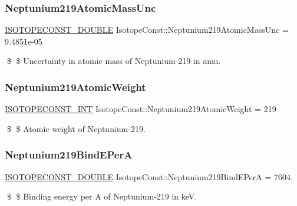 \subsubsection{\texorpdfstring{Neptunium219\+Atomic\+Mass\+Unc}{Neptunium219AtomicMassUnc}}
{\footnotesize\ttfamily \mbox{\hyperlink{group___isotope_const-_macros_ga8f45a7272ce02c0b4c65c44636ed719a}{I\+S\+O\+T\+O\+P\+E\+C\+O\+N\+S\+T\+\_\+\+D\+O\+U\+B\+LE}} Isotope\+Const\+::\+Neptunium219\+Atomic\+Mass\+Unc = 9.\+4851e-\/05}

\$ \$ Uncertainty in atomic mass of Neptunium-\/219 in amu. \mbox{\label{group___isotope_const-_neptunium-_np219_gadfc384d22014f9dadd89eec8d997eef2}} 
\subsubsection{\texorpdfstring{Neptunium219\+Atomic\+Weight}{Neptunium219AtomicWeight}}
{\footnotesize\ttfamily \mbox{\hyperlink{group___isotope_const-_macros_ga5f18360b3e99483a35c32d789e62621c}{I\+S\+O\+T\+O\+P\+E\+C\+O\+N\+S\+T\+\_\+\+I\+NT}} Isotope\+Const\+::\+Neptunium219\+Atomic\+Weight = 219}

\$ \$ Atomic weight of Neptunium-\/219. \mbox{\label{group___isotope_const-_neptunium-_np219_gae045e753e5df7613f63292d0b2cb5e1e}} 
\subsubsection{\texorpdfstring{Neptunium219\+Bind\+E\+PerA}{Neptunium219BindEPerA}}
{\footnotesize\ttfamily \mbox{\hyperlink{group___isotope_const-_macros_ga8f45a7272ce02c0b4c65c44636ed719a}{I\+S\+O\+T\+O\+P\+E\+C\+O\+N\+S\+T\+\_\+\+D\+O\+U\+B\+LE}} Isotope\+Const\+::\+Neptunium219\+Bind\+E\+PerA = 7604.}

\$ \$ Binding energy per A of Neptunium-\/219 in keV. \mbox{\label{group___isotope_const-_neptunium-_np219_gab6e8c561473b3e976e80ea0c3672ee0a}} 
